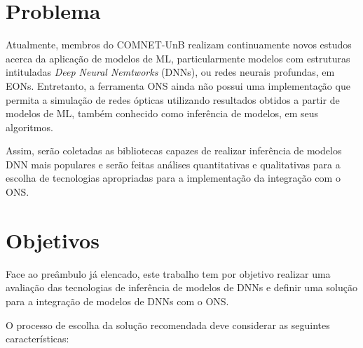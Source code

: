 \section{Problema}
\label{intro-problem}

Atualmente, membros do COMNET-UnB realizam continuamente novos estudos acerca da aplicação de modelos de ML, particularmente modelos com estruturas intituladas \textit{Deep Neural Nemtworks} (DNNs), ou redes neurais profundas, em EONs. Entretanto, a ferramenta ONS ainda não possui uma implementação que permita a simulação de redes ópticas utilizando resultados obtidos a partir de modelos de ML, também conhecido como inferência de modelos, em seus algoritmos.

Assim, serão coletadas as bibliotecas capazes de realizar inferência de modelos DNN mais populares e serão feitas análises quantitativas e qualitativas para a escolha de tecnologias apropriadas para a implementação da integração com o ONS.

\section{Objetivos}
\label{intro-goals}

Face ao preâmbulo já elencado, este trabalho tem por objetivo realizar uma avaliação das tecnologias de inferência de modelos de DNNs e definir uma solução para a integração de modelos de DNNs com o ONS.

O processo de escolha da solução recomendada deve considerar as seguintes características:

